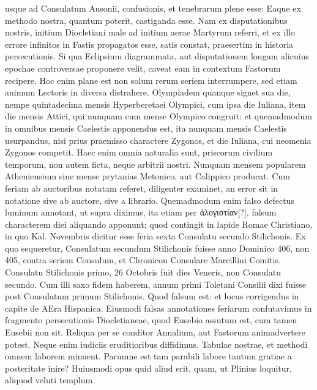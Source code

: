 usque ad Consulatum Ausonii, confusionis, et tenebrarum plene esse:
Eaque ex methodo nostra, quantum poterit, castiganda esse.
Nam ex disputationibus
nostris, initium Diocletiani male ad initium aerae Martyrum
referri, et ex illo errore infinitos in Fastis propagatos esse, satis
constat, praesertim in historia persecutionis.
Si qua Eclipsium diagrammata,
aut disputationem longam alicuius epochae controversae proponere
velit, caveat eam in contextum Fastorum recipere.
Hoc enim
plane est non solum rerum seriem interrumpere, sed etiam animum
Lectoris in diversa distrahere.
%
Olympiadem quanque signet sua die,
nempe quintadecima mensis Hyperberetaei Olympici, cum ipsa die
Iuliana, item die mensis Attici, qui nunquam cum mense Olympico
congruit: et quemadmodum in omnibus mensis Caelestis apponendus
est, ita nunquam mensis Caelestis usurpandus, nisi prius praemisso charactere
Zygonos, et die Iuliana, cui neomenia Zygonos competit.
Haec enim omnia naturalia sunt, priscorum civilium temporum, non
autem ficta, neque arbitrii nostri.
Nunquam mensem popularem Atheniensium
sine mense prytanias Metonico, aut Calippico producat.
Cum feriam ab auctoribus notatam referet, diligenter examinet, an
error sit in notatione sive ab auctore, sive a librario.
Quemadmodum
enim falso defectus luminum annotant, ut supra diximus, ita etiam
per \textgreek{ἀλογιστίαν[?]}, falsum characterem diei aliquando apponunt;
 quod contingit
in lapide Romae Christiano, in quo  Kal. Novembris dicitur
esse feria sexta Consulatu secundo Stilichonis.
Ex quo sequeretur, Consulatum
secundum Stilichonis fuisse anno Dominico 406, non 405,
contra seriem Consulum, et Chronicon Consulare Marcillini Comitis.
Consulatu Stilichonis primo, 26 Octobris fuit dies Veneris,
non Consulatu secundo.
Cum illi saxo fidem haberem, annum primi
Toletani Consilii dixi fuisse post Consulatum primum Stilichonis.
Quod falsum est: et locus corrigendus in capite de AEra Hispanica.
Eiusmodi falsas annotationes feriarum confutavimus in fragmento
persecutionis Diocletianeae, quod Eusebio assutum est, cum tamen
Eusebii non sit.
Reliqua per se conditor Annalium, aut Fastorum animadvertere
potest.
Neque enim iudiciis eruditioribus diffidimus.
Tabulae nostrae, et methodi omnem laborem minuent.
Parumne est
tam parabili labore tantum gratiae a posteritate inire?
Huiusmodi
opus quid aliud erit, quam, ut Plinius loquitur, aliquod veluti templum
